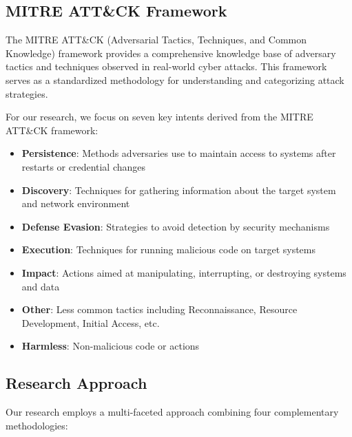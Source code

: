 \documentclass[acmlarge,screen,nonacm]{acmart}
\begin{document}
\subsection{MITRE ATT\&CK Framework}

The MITRE ATT\&CK (Adversarial Tactics, Techniques, and Common Knowledge) framework provides a comprehensive knowledge base of adversary tactics and techniques observed in real-world cyber attacks. This framework serves as a standardized methodology for understanding and categorizing attack strategies.

For our research, we focus on seven key intents derived from the MITRE ATT\&CK framework:
\begin{itemize}
    \item \textbf{Persistence}: Methods adversaries use to maintain access to systems after restarts or credential changes
    \item \textbf{Discovery}: Techniques for gathering information about the target system and network environment
    \item \textbf{Defense Evasion}: Strategies to avoid detection by security mechanisms
    \item \textbf{Execution}: Techniques for running malicious code on target systems
    \item \textbf{Impact}: Actions aimed at manipulating, interrupting, or destroying systems and data
    \item \textbf{Other}: Less common tactics including Reconnaissance, Resource Development, Initial Access, etc.
    \item \textbf{Harmless}: Non-malicious code or actions
\end{itemize}

\subsection{Research Approach}

Our research employs a multi-faceted approach combining four complementary methodologies:
\end{document}
